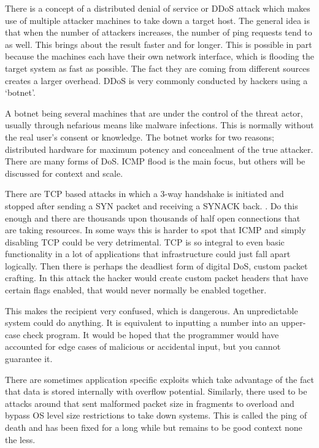 There is a concept of a distributed denial of service or DDoS attack which makes use of multiple attacker machines to take down a target host. The general idea is that when the number of attackers increases, the number of ping requests tend to as well. This brings about the result faster and for longer. This is possible in part because the machines each have their own network interface, which is flooding the target system as fast as possible. 
The fact they are coming from different sources creates a larger overhead. DDoS is very commonly conducted by hackers using a ‘botnet’. 

A botnet being several machines that are under the control of the threat actor, usually through nefarious means like malware infections. This is normally without the real user’s consent or knowledge. The botnet works for two reasons; distributed hardware for maximum potency and concealment of the true attacker. 
There are many forms of DoS. ICMP flood is the main focus, but others will be discussed for context and scale. 

There are TCP based attacks in which a 3-way handshake is initiated and stopped after sending a SYN packet and receiving a SYNACK back. \citep{DoSMit}. 
Do this enough and there are thousands upon thousands of half open connections that are taking resources. In some ways this is harder to spot that ICMP and simply disabling TCP could be very detrimental. TCP is so integral to even basic functionality in a lot of applications that infrastructure could just fall apart logically. \citep{DoSExplained}
Then there is perhaps the deadliest form of digital DoS, custom packet crafting. In this attack the hacker would create custom packet headers that have certain flags enabled, that would never normally be enabled together. 

This makes the recipient very confused, which is dangerous. An unpredictable system could do anything. It is equivalent to inputting a number into an upper-case check program. 
It would be hoped that the programmer would have accounted for edge cases of malicious or accidental input, but you cannot guarantee it. 

There are sometimes application specific exploits which take advantage of the fact that data is stored internally with overflow potential. Similarly, there used to be attacks around that sent malformed packet size in fragments to overload and bypass OS level size restrictions to take down systems. 
This is called the ping of death and has been fixed for a long while but remains to be good context none the less. \citep{ICMPFloodDetPrev}

